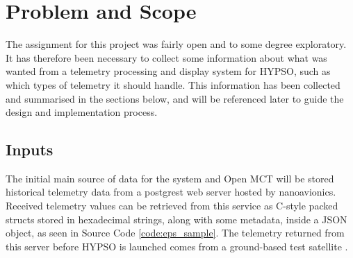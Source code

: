 \begin{comment}
Assignment has no clear scope or specification, exploratory to some degree since much of it is unknown - set own requirements

Design Open MCT implementation; get telemetry from different sources, parse and adapt for display

Minimize overhead with adding new data sources - should require work in a small amount of new code; backend and frontend needs to be flexible

Prioritize loading and working with current known data sources (NA telemetry)
Requirements
 - Should be able to load current NA telemetry from their DB
 - Needs to be modular and maintainable
 - Should be able to provide x amount of data to x users in x time
 
What do we have to work with - how do we get telemetry, what form does it come in?
 - C struct stored in hex string

What restrictions do we have on how/when/where we can get the telemetry?
 - Restricted by IP, cannot get telemetry from anywhere easily - need to go through NA contact person to get new machines added

What does Open MCT need?
 - Object provider
 - Telemetry provider
 - Telemetry metadata provider
\end{comment}

\section{Problem and Scope} \label{scope}
The assignment for this project was fairly open and to some degree exploratory. It has therefore been necessary to collect some information about what was wanted from a telemetry processing and display system for HYPSO, such as which types of telemetry it should handle. This information has been collected and summarised in the sections below, and will be referenced later to guide the design and implementation process.

\subsection{Inputs}
The initial main source of data for the system and Open MCT will be stored historical telemetry data from a \Gls{postgrest} web server hosted by \Gls{nanoavionics}. Received telemetry values can be retrieved from this service as C-style packed \glspl{struct} stored in hexadecimal strings, along with some metadata, inside a JSON object, as seen in Source Code \ref{code:eps_sample}. The telemetry returned from this server before HYPSO is launched comes from a ground-based test satellite \cite{na_postgrest}.

